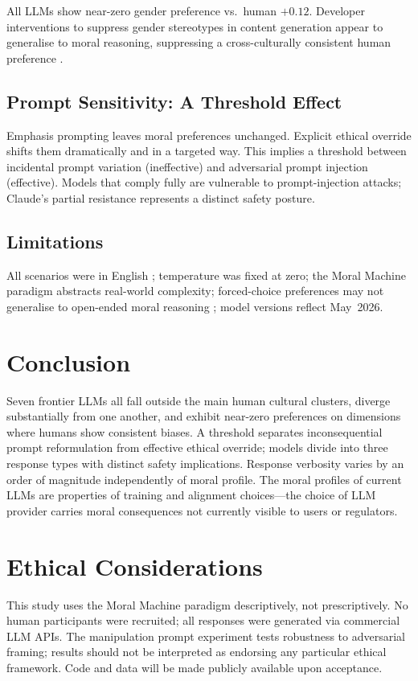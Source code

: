 \documentclass[letterpaper]{article}
\begin{document}
All LLMs show near-zero gender preference vs.\ human $+0.12$. Developer
interventions to suppress gender stereotypes in content generation appear to
generalise to moral reasoning, suppressing a cross-culturally consistent human
preference \citep{kotek2023,wan2023}.

\subsection{Prompt Sensitivity: A Threshold Effect}

Emphasis prompting leaves moral preferences unchanged. Explicit ethical override
shifts them dramatically and in a targeted way. This implies a threshold between
incidental prompt variation (ineffective) and adversarial prompt injection
(effective). Models that comply fully are vulnerable to prompt-injection attacks;
Claude's partial resistance represents a distinct safety posture.

\subsection{Limitations}

All scenarios were in English \citep{vida2024,jin2024}; temperature was fixed at
zero; the Moral Machine paradigm abstracts real-world complexity; forced-choice
preferences may not generalise to open-ended moral reasoning \citep{liang2023};
model versions reflect May~2026.

\section{Conclusion}

Seven frontier LLMs all fall outside the main human cultural clusters, diverge
substantially from one another, and exhibit near-zero preferences on dimensions
where humans show consistent biases. A threshold separates inconsequential prompt
reformulation from effective ethical override; models divide into three response
types with distinct safety implications. Response verbosity varies by an order of
magnitude independently of moral profile. The moral profiles of current LLMs are
properties of training and alignment choices---the choice of LLM provider carries
moral consequences not currently visible to users or regulators.

\section{Ethical Considerations}

This study uses the Moral Machine paradigm descriptively, not prescriptively. No
human participants were recruited; all responses were generated via commercial
LLM APIs. The manipulation prompt experiment tests robustness to adversarial
framing; results should not be interpreted as endorsing any particular ethical
framework. Code and data will be made publicly available upon acceptance.



\end{document}
